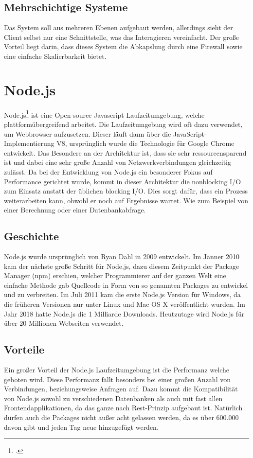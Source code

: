 \subsection{Mehrschichtige Systeme}
Das System soll aus mehreren Ebenen aufgebaut werden, allerdings sieht der Client selbst nur eine Schnittstelle, was das Interagieren vereinfacht. Der große Vorteil liegt darin, dass dieses System die Abkapslung durch eine Firewall sowie eine einfache Skalierbarkeit bietet.		 	
\section{Node.js}
Node.js\footcite{nodejs} ist eine Open-source Javascript Laufzeitumgebung, welche plattformübergreifend arbeitet. 
Die Laufzeitumgebung wird oft dazu verwendet, um Webbrowser aufzusetzen. 
Dieser läuft dann über die JavaScript-Implementierung V8, ursprünglich wurde die Technologie für Google Chrome entwickelt. 
Das Besondere an der Architektur ist, dass sie sehr ressourcensparend ist und dabei eine sehr große Anzahl von Netzwerkverbindungen gleichzeitig zulässt. 
Da bei der Entwicklung von Node.js ein besonderer Fokus auf Performance gerichtet wurde, kommt in dieser Architektur die nonblocking I/O zum Einsatz anstatt der üblichen blocking I/O. Dies sorgt dafür, dass ein Prozess weiterarbeiten kann, obwohl er noch auf Ergebnisse wartet.
Wie zum Beispiel von einer Berechnung oder einer Datenbankabfrage. 		 	
\subsection{Geschichte}
Node.js wurde ursprünglich von Ryan Dahl in 2009 entwickelt. 
Im Jänner 2010 kam der nächste große Schritt für Node.js, dazu diesem Zeitpunkt der Package Manager (npm) erschien, welcher Programmierer auf der ganzen Welt eine einfache Methode gab Quellcode in Form von so genannten Packages zu entwickel und zu verbreiten. 
Im Juli 2011 kam die erste Node.js Version für Windows, da die früheren Versionen nur unter Linux und Mac OS X veröffentlicht wurden. Im Jahr 2018 hatte Node.js die 1 Milliarde Downloads. Heutzutage wird Node.js für über 20 Millionen Webseiten verwendet. 		 		
\subsection{Vorteile}
Ein großer Vorteil der Node.js Laufzeitumgebung ist die Performanz welche geboten wird. 
Diese Performanz fällt besonders bei einer großen Anzahl von Verbindungen, beziehungsweise Anfragen auf. 
Dazu kommt die Kompatibilität von Node.js sowohl zu verschiedenen Datenbanken als auch mit fast allen Frontendapplikationen, da das ganze nach Rest-Prinzip aufgebaut ist. 
Natürlich dürfen auch die Packages nicht außer acht gelassen werden, da es über 600.000 davon gibt und jeden Tag neue hinzugefügt werden.		 		
